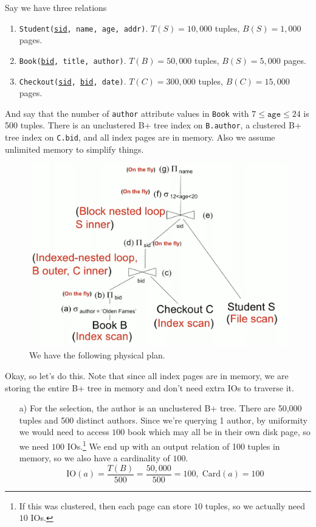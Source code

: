\documentclass{article}
\begin{document}
    \begin{example}
      Say we have three relations 
      \begin{enumerate}
        \item \texttt{Student(\underline{sid}, name, age, addr)}. $T(S) = 10,000$ tuples, $B(S) = 1,000$ pages. 
        \item \texttt{Book(\underline{bid}, title, author)}. $T(B) = 50,000$ tuples, $B(S) = 5,000$ pages. 
        \item \texttt{Checkout(\underline{sid}, \underline{bid}, date)}. $T(C) = 300,000$ tuples, $B(C) = 15,000$ pages. 
      \end{enumerate}
      And say that the number of \texttt{author} attribute values in \texttt{Book} with $7 \leq \texttt{age} \leq 24$ is 500 tuples. There is an unclustered B+ tree index on \texttt{B.author}, a clustered B+ tree index on \texttt{C.bid}, and all index pages are in memory. Also we assume unlimited memory to simplify things. 
      \begin{figure}[H]
        \centering 
        \includegraphics[scale=0.4]{img/book_plan.png}
        \caption{We have the following physical plan.} 
        \label{fig:book_plan}
      \end{figure} 
      Okay, so let's do this. Note that since all index pages are in memory, we are storing the entire B+ tree in memory and don't need extra IOs to traverse it.  
      \begin{enumerate}
        \item[a)] For the selection, the author is an unclustered B+ tree. There are 50,000 tuples and 500 distinct authors. Since we're querying 1 author, by uniformity we would need to access $100$ book which may all be in their own disk page, so we need $100$ IOs.\footnote{If this was clustered, then each page can store $10$ tuples, so we actually need $10$ IOs. } We end up with an output relation of 100 tuples in memory, so we also have a cardinality of $100$. 
          \begin{equation}
            \mathrm{IO}(a) = \frac{T(B)}{500} = \frac{50,000}{500} = 100, \; \mathrm{Card}(a) = 100 
          \end{equation}


\end{enumerate}
\end{example}
\end{document}
